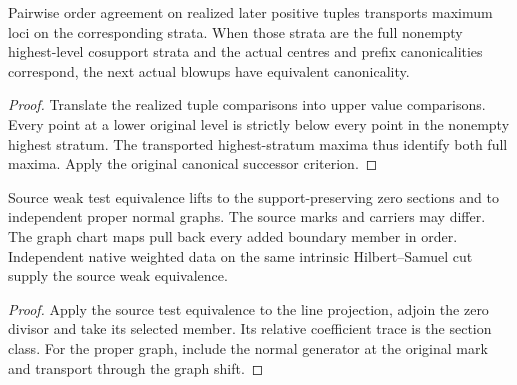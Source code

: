 \begin{theorem}
\label{hir:g1-later-highest-stratum-canonical-step}
\leanok
Pairwise order agreement on realized later positive tuples
transports maximum loci on the corresponding strata. When
those strata are the full nonempty highest-level cosupport
strata and the actual centres and prefix canonicalities
correspond, the next actual blowups have equivalent canonicality.
\end{theorem}
\begin{proof}
Translate the realized tuple comparisons into upper value
comparisons. Every point at a lower original level is
strictly below every point in the nonempty highest stratum.
The transported highest-stratum maxima thus identify both
full maxima. Apply the original canonical successor criterion.
\end{proof}

\begin{theorem}
\label{hir:g1-source-weak-graph-lift}
\leanok
Source weak test equivalence lifts to the support-preserving
zero sections and to independent proper normal graphs. The
source marks and carriers may differ. The graph chart maps
pull back every added boundary member in order. Independent
native weighted data on the same intrinsic Hilbert--Samuel
cut supply the source weak equivalence.
\end{theorem}
\begin{proof}
Apply the source test equivalence to the line projection,
adjoin the zero divisor and take its selected member. Its
relative coefficient trace is the section class. For the
proper graph, include the normal generator at the original
mark and transport through the graph shift.
\end{proof}

